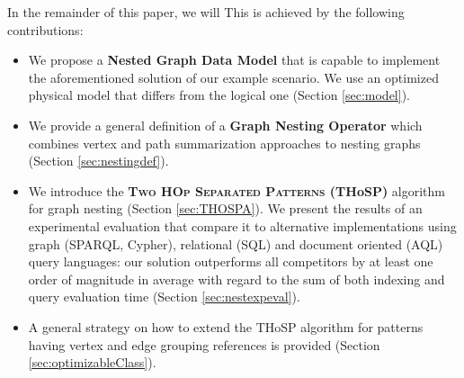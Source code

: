 In the remainder of this paper, we will  This is achieved by the following contributions:

\begin{itemize}
	\item We propose a \textbf{Nested Graph Data Model} that is capable to implement the aforementioned solution of our example scenario. We use an optimized physical model that differs from the logical one (Section \ref{sec:model}).
	
	\item We provide  a general definition of a \textbf{Graph Nesting Operator} which combines vertex and path summarization approaches to nesting graphs (Section \ref{sec:nestingdef}).
	\item We introduce the  \textbf{\textsc{{Two HOp Separated Patterns}} (THoSP)} algorithm for graph nesting (Section \ref{sec:THOSPA}). We present the results of an experimental evaluation that compare it to alternative implementations using graph (SPARQL, Cypher), relational (SQL) and document oriented (AQL) query languages: our solution outperforms all competitors by at least one order of magnitude in average with regard to the sum of both indexing and query evaluation time (Section \ref{sec:nestexpeval}).
	
	\item A general strategy on how to extend the THoSP algorithm for patterns having vertex and edge grouping references is provided (Section \ref{sec:optimizableClass}).
\end{itemize}



